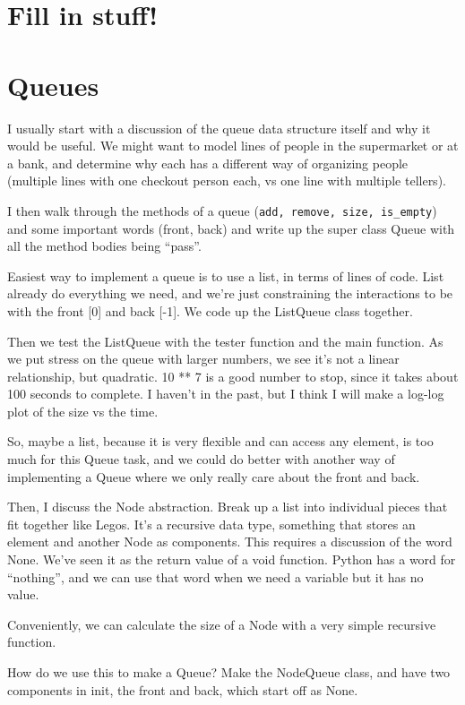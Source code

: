 \documentclass{article}
\begin{document}
\section*{Fill in stuff!}

\section*{Queues}

I usually start with a discussion of the queue data structure itself and
why it would be useful. We might want to model lines of people in the
supermarket or at a bank, and determine why each has a different way of
organizing people (multiple lines with one checkout person each, vs one
line with multiple tellers).

I then walk through the methods of a queue
(\verb|add, remove, size, is_empty|) and some important words (front,
back) and write up the super class Queue with all the method bodies
being “pass”.

Easiest way to implement a queue is to use a list, in terms of lines of
code. List already do everything we need, and we're just constraining the
interactions to be with the front [0] and back [-1]. We code up the
ListQueue class together.

Then we test the ListQueue with the tester function and the main function.
As we put stress on the queue with larger numbers, we see it's not a linear
relationship, but quadratic. 10 ** 7 is a good number to stop, since it
takes about 100 seconds to complete. I haven't in the past, but I think I
will make a log-log plot of the size vs the time.

So, maybe a list, because it is very flexible and can access any element,
is too much for this Queue task, and we could do better with another way of
implementing a Queue where we only really care about the front and back.

Then, I discuss the Node abstraction. Break up a list into individual
pieces that fit together like Legos. It's a recursive data type, something
that stores an element and another Node as components.  This requires a
discussion of the word None. We've seen it as the return value of a void
function. Python has a word for “nothing”, and we can use that word when we
need a variable but it has no value.

Conveniently, we can calculate the size of a Node with a very simple
recursive function.

How do we use this to make a Queue? Make the NodeQueue class, and have two
components in init, the front and back, which start off as None.
\end{document}
